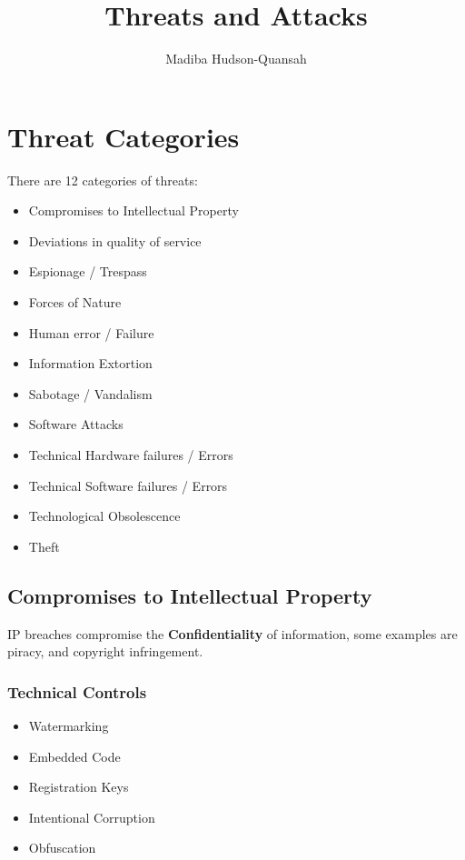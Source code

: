 \documentclass[12pt letter]{report}
\title{\Huge{Threats and Attacks}}
\author{\huge{Madiba Hudson-Quansah}}
\date{}
\begin{document}
\maketitle
\newpage
{}
\tableofcontents
\pagebreak

\chapter{Threat Categories}

There are 12 categories of threats:
\begin{itemize}
  \item Compromises to Intellectual Property
  \item Deviations in quality of service
  \item Espionage / Trespass
  \item Forces of Nature
  \item Human error / Failure
  \item Information Extortion
  \item Sabotage / Vandalism
  \item Software Attacks
  \item Technical Hardware failures / Errors
  \item Technical Software failures / Errors
  \item Technological Obsolescence
  \item Theft
\end{itemize}

\section{Compromises to Intellectual Property}


IP breaches compromise the \textbf{Confidentiality} of information,
some examples are piracy, and copyright infringement.

\subsection{Technical Controls}

\begin{itemize}
  \item Watermarking
  \item Embedded Code
  \item Registration Keys
  \item Intentional Corruption
  \item Obfuscation
\end{itemize}
\end{document}
